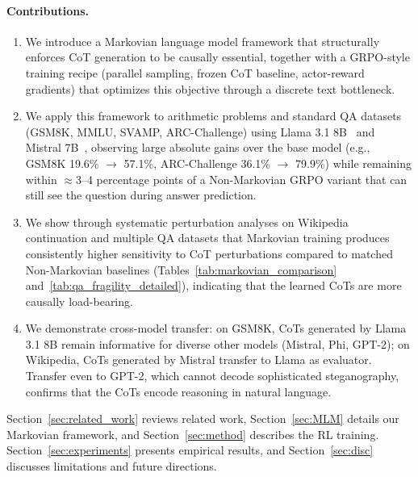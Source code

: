 \documentclass{article} %
\begin{document}
\paragraph{Contributions.}
\begin{enumerate}
    \item We introduce a Markovian language model framework that structurally enforces CoT generation to be causally essential, together with a GRPO-style training recipe (parallel sampling, frozen CoT baseline, actor-reward gradients) that optimizes this objective through a discrete text bottleneck.
    \item We apply this framework to arithmetic problems and standard QA datasets (GSM8K, MMLU, SVAMP, ARC-Challenge) using Llama 3.1 8B~\citep{dubey2024llama3herdmodels} and Mistral 7B~\citep{jiang2023mistral}, observing large absolute gains over the base model (e.g., GSM8K 19.6\% $\to$ 57.1\%, ARC-Challenge 36.1\% $\to$ 79.9\%) while remaining within $\approx$3--4 percentage points of a Non-Markovian GRPO variant that can still see the question during answer prediction.
    \item We show through systematic perturbation analyses on Wikipedia continuation and multiple QA datasets that Markovian training produces consistently higher sensitivity to CoT perturbations compared to matched Non-Markovian baselines (Tables~\ref{tab:markovian_comparison} and~\ref{tab:qa_fragility_detailed}), indicating that the learned CoTs are more causally load-bearing.
    \item We demonstrate cross-model transfer: on GSM8K, CoTs generated by Llama 3.1 8B remain informative for diverse other models (Mistral, Phi, GPT-2); on Wikipedia, CoTs generated by Mistral transfer to Llama as evaluator. Transfer even to GPT-2, which cannot decode sophisticated steganography, confirms that the CoTs encode reasoning in natural language.
\end{enumerate}

Section~\ref{sec:related_work} reviews related work, Section~\ref{sec:MLM} details our Markovian framework, and Section~\ref{sec:method} describes the RL training. Section~\ref{sec:experiments} presents empirical results, and Section~\ref{sec:disc} discusses limitations and future directions.
\end{document}
